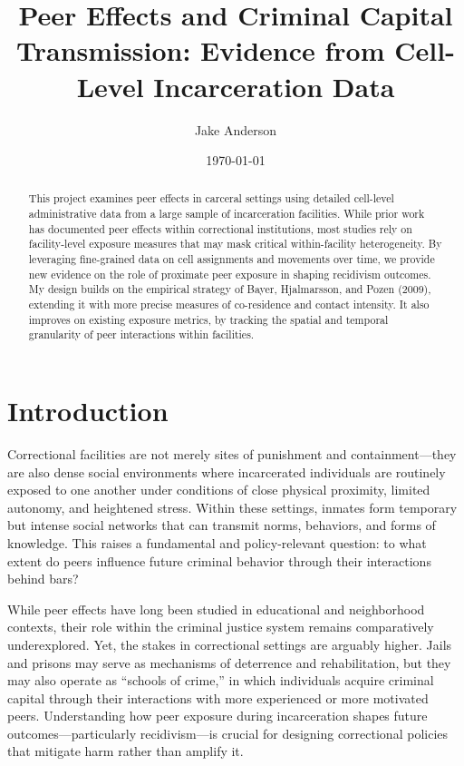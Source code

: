 \documentclass[12pt, a4paper]{article}
\title{Peer Effects and Criminal Capital Transmission: Evidence from Cell-Level Incarceration Data}
\author{Jake Anderson}
\date{\today}
\begin{document}
\maketitle


\begin{abstract}
    This project examines peer effects in carceral settings using detailed cell-level administrative data from a large sample of incarceration facilities. While prior work has documented peer effects within correctional institutions, most studies rely on facility-level exposure measures that may mask critical within-facility heterogeneity. By leveraging fine-grained data on cell assignments and movements over time, we provide new evidence on the role of proximate peer exposure in shaping recidivism outcomes. My design builds on the empirical strategy of Bayer, Hjalmarsson, and Pozen (2009), extending it with more precise measures of co-residence and contact intensity. It also improves on existing exposure metrics, by tracking the spatial and temporal granularity of peer interactions within facilities.
\end{abstract}

\newpage
\section{Introduction}

Correctional facilities are not merely sites of punishment and containment—they are also dense social environments where incarcerated individuals are routinely exposed to one another under conditions of close physical proximity, limited autonomy, and heightened stress. Within these settings, inmates form temporary but intense social networks that can transmit norms, behaviors, and forms of knowledge. This raises a fundamental and policy-relevant question: to what extent do peers influence future criminal behavior through their interactions behind bars?

While peer effects have long been studied in educational and neighborhood contexts, their role within the criminal justice system remains comparatively underexplored. Yet, the stakes in correctional settings are arguably higher. Jails and prisons may serve as mechanisms of deterrence and rehabilitation, but they may also operate as “schools of crime,” in which individuals acquire criminal capital through their interactions with more experienced or more motivated peers. Understanding how peer exposure during incarceration shapes future outcomes—particularly recidivism—is crucial for designing correctional policies that mitigate harm rather than amplify it.
\end{document}
